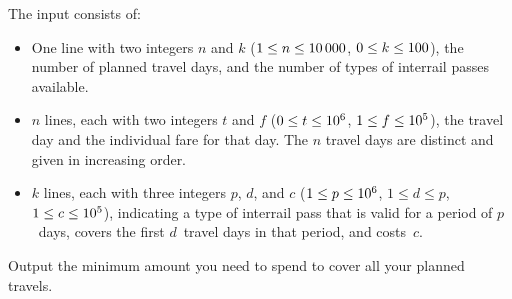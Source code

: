 \begin{Input}
    The input consists of:
    \begin{itemize}
        \item One line with two integers $n$ and $k$ ($1\leq n\leq 10\,000$,
    $0\leq k\leq 100$), the number of planned travel days,
    and the number of types of interrail passes available.
        \item $n$ lines, each with two integers $t$ and $f$ ($0\leq
    t \leq 10^6$, $1\leq f\leq 10^5$), the travel day and the
    individual fare for that day.
    The $n$ travel days are distinct and given in increasing order.
        \item $k$ lines, each with three integers $p$, $d$, and $c$ ($1\leq
    p\leq 10^6$, $1\leq d\leq p$, $1\leq c\leq 10^5$), indicating a type of
    interrail pass that is valid for a period of $p$~days, covers the first
    $d$~travel days in that period, and costs~$c$.
    \end{itemize}
\end{Input}

\begin{Output}
    Output the minimum amount you need to spend to cover all your planned travels.
\end{Output}
